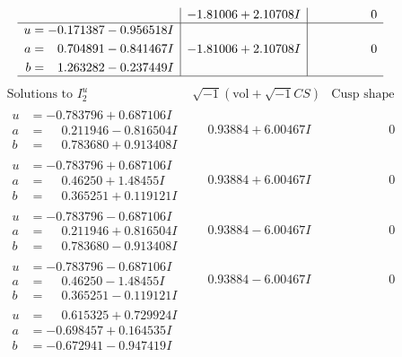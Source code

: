 \documentclass[1p]{elsarticle_modified}
\theoremstyle{definition}
\newcommand{\I}{\sqrt{-1}}
\begin{document}
$$\begin{array}{c|c|c}
 & -1.81006 + 2.10708 I & \phantom{-0.000000 } 0 \\ \hline\begin{aligned}
u &= -0.171387 - 0.956518 I \\
a &= \phantom{-}0.704891 - 0.841467 I \\
b &= \phantom{-}1.263282 - 0.237449 I\end{aligned}
 & -1.81006 + 2.10708 I & \phantom{-0.000000 } 0\\
 \hline 
 \end{array}$$\newpage$$\begin{array}{c|c|c}  
\text{Solutions to }I^u_{2}& \I (\text{vol} + \sqrt{-1}CS) & \text{Cusp shape}\\
 \hline 
\begin{aligned}
u &= -0.783796 + 0.687106 I \\
a &= \phantom{-}0.211946 - 0.816504 I \\
b &= \phantom{-}0.783680 + 0.913408 I\end{aligned}
 & \phantom{-}0.93884 + 6.00467 I & \phantom{-0.000000 } 0 \\ \hline\begin{aligned}
u &= -0.783796 + 0.687106 I \\
a &= \phantom{-}0.46250 + 1.48455 I \\
b &= \phantom{-}0.365251 + 0.119121 I\end{aligned}
 & \phantom{-}0.93884 + 6.00467 I & \phantom{-0.000000 } 0 \\ \hline\begin{aligned}
u &= -0.783796 - 0.687106 I \\
a &= \phantom{-}0.211946 + 0.816504 I \\
b &= \phantom{-}0.783680 - 0.913408 I\end{aligned}
 & \phantom{-}0.93884 - 6.00467 I & \phantom{-0.000000 } 0 \\ \hline\begin{aligned}
u &= -0.783796 - 0.687106 I \\
a &= \phantom{-}0.46250 - 1.48455 I \\
b &= \phantom{-}0.365251 - 0.119121 I\end{aligned}
 & \phantom{-}0.93884 - 6.00467 I & \phantom{-0.000000 } 0 \\ \hline\begin{aligned}
u &= \phantom{-}0.615325 + 0.729924 I \\
a &= -0.698457 + 0.164535 I \\
b &= -0.672941 - 0.947419 I\end{aligned}

\end{array}$$
\end{document}
